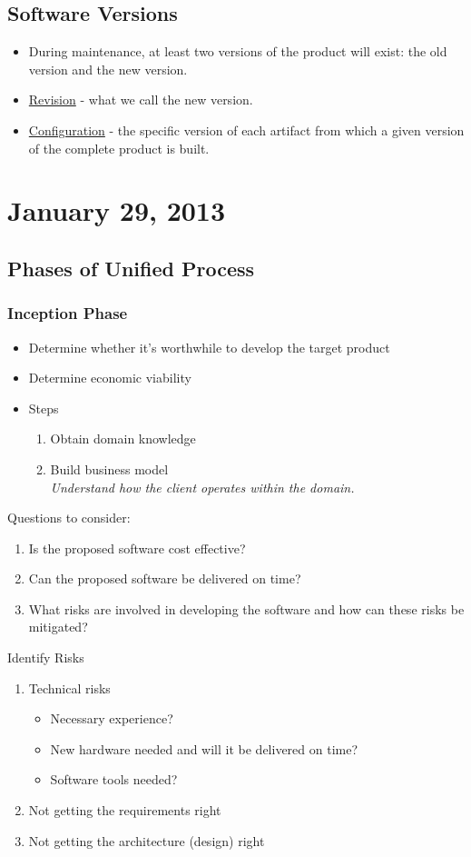 \documentclass{report}
\begin{document}
		\section{Software Versions}
			\begin{itemize}
				\item During maintenance, at least two versions of the product will exist: the old version and the new version.
				\item \underline{Revision} - what we call the new version.
				\item \underline{Configuration} - the specific version of each artifact from which a given version of the complete product is built.
			\end{itemize}
	\chapter{January 29, 2013}	
		\section{Phases of Unified Process}
			\subsection{Inception Phase}
				\begin{itemize}
					\item Determine whether it's worthwhile to develop the target product
					\item Determine economic viability
					\item Steps
						\begin{enumerate}
							\item Obtain domain knowledge
							\item Build business model\\
								\textit{Understand how the client operates within the domain.}
						\end{enumerate}
				\end{itemize}
				Questions to consider:
				\begin{enumerate}
					\item Is the proposed software cost effective?
					\item Can the proposed software be delivered on time?
					\item What risks are involved in developing the software and how can these risks be mitigated?
				\end{enumerate}
				Identify Risks
				\begin{enumerate}
					\item Technical risks
					\begin{itemize}
						\item Necessary experience?
						\item New hardware needed and will it be delivered on time?
						\item Software tools needed?
					\end{itemize}
					\item Not getting the requirements right
					\item Not getting the architecture (design) right
				\end{enumerate}
\end{document}
